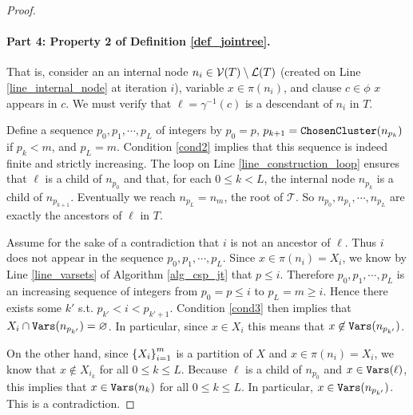 \begin{proof}
\paragraph{Part 4: Property 2 of Definition \ref{def_jointree}.}
That is, consider an an internal node $n_i \in \mathcal{V}(T) \setminus \mathcal{L}(T)$ (created on Line \ref{line_internal_node} at iteration $i$), variable $x \in \pi(n_i)$, and clause $c \in \phi$ \st{} $x$ appears in $c$. We must verify that $\ell = \gamma^{-1}(c)$ is a descendant of $n_i$ in $T$.

Define a sequence $p_0, p_1, \cdots, p_L$ of integers by $p_0 = p$, $p_{k+1} = \texttt{\upshape ChosenCluster}(n_{p_k})$ if $p_k < m$, and $p_L = m$.
Condition \ref{cond2} implies that this sequence is indeed finite and strictly increasing.
The loop on Line \ref{line_construction_loop} ensures that $\ell$ is a child of $n_{p_0}$ and that, for each $0 \leq k < L$, the internal node $n_{p_k}$ is a child of $n_{p_{k+1}}$.
Eventually we reach $n_{p_L} = n_m$, the root of $\mathcal{T}$.
So $n_{p_0}, n_{p_1}, \cdots, n_{p_L}$ are exactly the ancestors of $\ell$ in $T$.

Assume for the sake of a contradiction that $i$ is not an ancestor of $\ell$.
Thus $i$ does not appear in the sequence $p_0, p_1, \cdots, p_L$. 
Since $x \in \pi(n_i) = X_i$, we know by Line \ref{line_varsets} of Algorithm \ref{alg_csp_jt} that $p \leq i$.
Therefore $p_0, p_1, \cdots, p_L$ is an increasing sequence of integers from $p_0 = p \leq i$ to $p_L = m \geq i$.
Hence there exists some $k'$ s.t. $p_{k'} < i < p_{k'+1}$. 
Condition \ref{cond3} then implies that $X_i \cap \texttt{\upshape Vars}(n_{p_{k'}}) = \varnothing$.
In particular, since $x \in X_i$ this means that $x \not\in \texttt{\upshape Vars}(n_{p_{k'}})$.

On the other hand, since $\left\{ X_i \right\}_{i = 1}^m$ is a partition of $X$ and $x \in \pi(n_i) = X_i$, we know that $x \not\in X_{i_k}$ for all $0 \leq k \leq L$.
Because $\ell$ is a child of $n_{p_0}$ and $x \in \texttt{\upshape Vars}(\ell)$, this implies that $x \in \texttt{\upshape Vars}(n_k)$ for all $0 \leq k \leq L$.
In particular, $x \in \texttt{\upshape Vars}(n_{p_{k'}})$.
This is a contradiction.
\end{proof}


